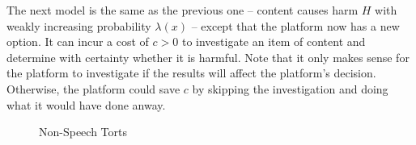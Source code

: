 The next model is the same as the previous one -- content causes harm $H$  with weakly increasing probability $\lambda(x)$ -- except that the platform now has a new option. It can incur a cost of $c > 0$ to investigate an item of content and determine with certainty whether it is harmful. Note that it only makes sense for the platform to investigate if the results will affect the platform's decision. Otherwise, the platform could save $c$ by skipping the investigation and doing what it would have done anway.





\begin{figure}[ht]
	\centering
{}
	\caption{Non-Speech Torts}
	\label{fig:factory}
\end{figure}